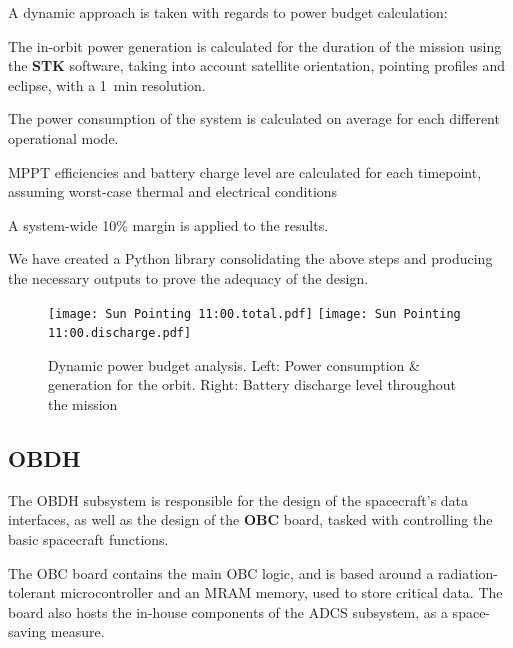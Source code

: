 \documentclass[a4paper,nobib]{tufte-book}
\begin{document}
\FloatBarrier
A dynamic approach is taken with regards to power budget calculation:
\begin{compactenum}
	\item The in-orbit power generation is calculated for the duration of the mission using the \textbf{STK} software, taking into account satellite orientation, pointing profiles and eclipse, with a \SI{1}{\minute} resolution.
	\item The power consumption of the system is calculated on average for each different operational mode.
	\item \acs{MPPT} efficiencies and battery charge level are calculated for each timepoint, assuming worst-case thermal and electrical conditions
	\item A system-wide 10\% margin is applied to the results.
\end{compactenum}

We have created a Python library consolidating the above steps and producing the necessary outputs to prove the adequacy of the design.

\begin{figure}[h]
	\texttt{[image: Sun Pointing 11:00.total.pdf]}
	\hfill
	\texttt{[image: Sun Pointing 11:00.discharge.pdf]}

	\caption[Dynamic power budget analysis]{Dynamic power budget analysis. Left: Power consumption \& generation for the orbit. Right: Battery discharge level throughout the mission}
\end{figure}

\subsection{\acf{OBDH}}
\label{sec:obdh}

The \ac{OBDH} subsystem is responsible for the design of the spacecraft's data interfaces, as well as the design of the \textbf{\acf{OBC}} board, tasked with controlling the basic spacecraft functions.\autocite{DDJF_OBDH}

The \ac{OBC} board contains the main \ac{OBC} logic, and is based around a  radiation-tolerant microcontroller and an \acs{MRAM} memory, used to store critical data. The board also hosts the in-house components of the \ac{ADCS} subsystem, as a space-saving measure.
\end{document}
